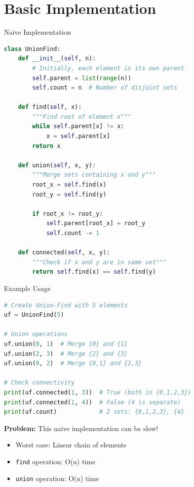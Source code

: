 \documentclass[aspectratio=169]{beamer}
\begin{document}
\section{Basic Implementation}

\begin{frame}[fragile]{Naive Implementation}
  \begin{lstlisting}[language=Python, basicstyle=\ttfamily\footnotesize]
class UnionFind:
    def __init__(self, n):
        # Initially, each element is its own parent
        self.parent = list(range(n))
        self.count = n  # Number of disjoint sets

    def find(self, x):
        """Find root of element x"""
        while self.parent[x] != x:
            x = self.parent[x]
        return x

    def union(self, x, y):
        """Merge sets containing x and y"""
        root_x = self.find(x)
        root_y = self.find(y)

        if root_x != root_y:
            self.parent[root_x] = root_y
            self.count -= 1

    def connected(self, x, y):
        """Check if x and y are in same set"""
        return self.find(x) == self.find(y)
  \end{lstlisting}
\end{frame}

\begin{frame}[fragile]{Example Usage}
  \begin{lstlisting}[language=Python, basicstyle=\ttfamily\footnotesize]
# Create Union-Find with 5 elements
uf = UnionFind(5)

# Union operations
uf.union(0, 1)  # Merge {0} and {1}
uf.union(2, 3)  # Merge {2} and {3}
uf.union(0, 2)  # Merge {0,1} and {2,3}

# Check connectivity
print(uf.connected(1, 3))  # True (both in {0,1,2,3})
print(uf.connected(1, 4))  # False (4 is separate)
print(uf.count)            # 2 sets: {0,1,2,3}, {4}
  \end{lstlisting}

  \vspace{0.5cm}
  \textbf{Problem:} This naive implementation can be slow!
  \begin{itemize}
    \item Worst case: Linear chain of elements
    \item \texttt{find} operation: O(n) time
    \item \texttt{union} operation: O(n) time
  \end{itemize}
\end{frame}
\end{document}
